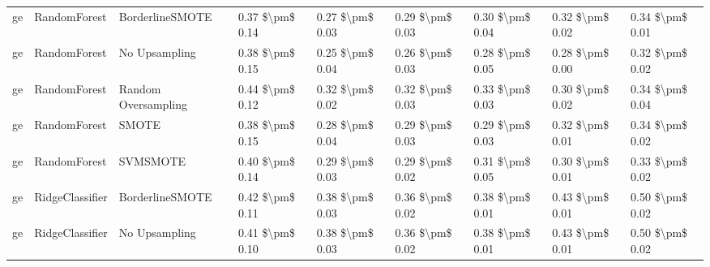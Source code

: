 \begin{tabular}{lllllllll}
      ge &                    RandomForest &               BorderlineSMOTE &     0.37 \$\textbackslash pm\$ 0.14 &           0.27 \$\textbackslash pm\$ 0.03 &       0.29 \$\textbackslash pm\$ 0.03 &        0.30 \$\textbackslash pm\$ 0.04 &                         0.32 \$\textbackslash pm\$ 0.02 &     0.34 \$\textbackslash pm\$ 0.01 \\
      ge &                    RandomForest &                 No Upsampling &     0.38 \$\textbackslash pm\$ 0.15 &           0.25 \$\textbackslash pm\$ 0.04 &       0.26 \$\textbackslash pm\$ 0.03 &        0.28 \$\textbackslash pm\$ 0.05 &                         0.28 \$\textbackslash pm\$ 0.00 &     0.32 \$\textbackslash pm\$ 0.02 \\
      ge &                    RandomForest &           Random Oversampling &     0.44 \$\textbackslash pm\$ 0.12 &           0.32 \$\textbackslash pm\$ 0.02 &       0.32 \$\textbackslash pm\$ 0.03 &        0.33 \$\textbackslash pm\$ 0.03 &                         0.30 \$\textbackslash pm\$ 0.02 &     0.34 \$\textbackslash pm\$ 0.04 \\
      ge &                    RandomForest &                         SMOTE &     0.38 \$\textbackslash pm\$ 0.15 &           0.28 \$\textbackslash pm\$ 0.04 &       0.29 \$\textbackslash pm\$ 0.03 &        0.29 \$\textbackslash pm\$ 0.03 &                         0.32 \$\textbackslash pm\$ 0.01 &     0.34 \$\textbackslash pm\$ 0.02 \\
      ge &                    RandomForest &                      SVMSMOTE &     0.40 \$\textbackslash pm\$ 0.14 &           0.29 \$\textbackslash pm\$ 0.03 &       0.29 \$\textbackslash pm\$ 0.02 &        0.31 \$\textbackslash pm\$ 0.05 &                         0.30 \$\textbackslash pm\$ 0.01 &     0.33 \$\textbackslash pm\$ 0.02 \\
      ge &                 RidgeClassifier &               BorderlineSMOTE &     0.42 \$\textbackslash pm\$ 0.11 &           0.38 \$\textbackslash pm\$ 0.03 &       0.36 \$\textbackslash pm\$ 0.02 &        0.38 \$\textbackslash pm\$ 0.01 &                         0.43 \$\textbackslash pm\$ 0.01 &     0.50 \$\textbackslash pm\$ 0.02 \\
      ge &                 RidgeClassifier &                 No Upsampling &     0.41 \$\textbackslash pm\$ 0.10 &           0.38 \$\textbackslash pm\$ 0.03 &       0.36 \$\textbackslash pm\$ 0.02 &        0.38 \$\textbackslash pm\$ 0.01 &                         0.43 \$\textbackslash pm\$ 0.01 &     0.50 \$\textbackslash pm\$ 0.02 \\

\end{tabular}

